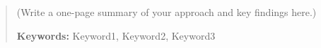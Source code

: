 \begin{abstract}

(Write a one-page summary of your approach and key findings here.)

\vspace{1em}
\noindent\textbf{Keywords:} Keyword1, Keyword2, Keyword3
\end{abstract}
